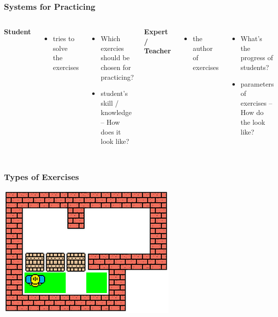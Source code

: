 \documentclass[xcolor=svgnames]{beamer}
\begin{document}
\begin{frame}
	\frametitle{Systems for Practicing}

	\begin{columns}[T]
		\textbf{Student}
		\begin{itemize}
			\item 	tries to solve the exercises
		\end{itemize}

		\bigskip
		\bigskip

		\begin{itemize}
			\item 	Which exercies should be chosen for practicing?
			\item 	student's skill / knowledge -- How does it look like?
		\end{itemize}

		\textbf{Expert / Teacher}
		\begin{itemize}
			\item 	the author of exercises
		\end{itemize}

		\bigskip
		\bigskip
		\begin{itemize}
			\item 	What's the progress of students?
			\item 	parameters of exercises -- How do the look like?
		\end{itemize}
	\end{columns}

\end{frame}
\begin{frame}
	\frametitle{Types of Exercises}

	\begin{center}
		\includegraphics[width=.6\textwidth]{2013-VV041-student-modeling/sokoban.png}
	\end{center}
\end{frame}
\end{document}
